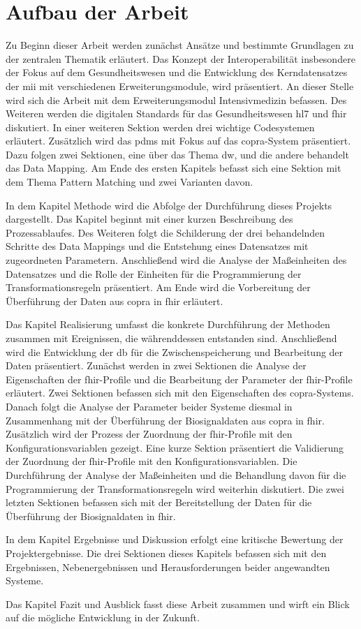\section{Aufbau der Arbeit} \label{sec:structure}

Zu Beginn dieser Arbeit werden zunächst Ansätze und bestimmte Grundlagen zu der zentralen Thematik erläutert. Das Konzept der Interoperabilität insbesondere der Fokus auf dem Gesundheitswesen und die Entwicklung des Kerndatensatzes der \ac{mii} mit verschiedenen Erweiterungsmodule, wird präsentiert. An dieser Stelle wird sich die Arbeit mit dem Erweiterungsmodul Intensivmedizin befassen. Des Weiteren werden die digitalen Standards für das Gesundheitswesen \ac{hl7} und \ac{fhir} diskutiert. In einer weiteren Sektion werden drei wichtige Codesystemen erläutert. Zusätzlich wird das \ac{pdms} mit Fokus auf das \ac{copra}-System präsentiert. Dazu folgen zwei Sektionen, eine über das Thema \ac{dw}, und die andere behandelt das Data Mapping. Am Ende des ersten Kapitels befasst sich eine Sektion mit dem Thema Pattern Matching und zwei Varianten davon.

In dem Kapitel \glqq Methode\grqq{} wird die Abfolge der Durchführung dieses Projekts dargestellt. Das Kapitel beginnt mit einer kurzen Beschreibung des Prozessablaufes. Des Weiteren folgt die Schilderung der drei behandelnden Schritte des Data Mappings und die Entstehung eines Datensatzes mit zugeordneten Parametern. Anschließend wird die Analyse der Maßeinheiten des Datensatzes und die Rolle der Einheiten für die Programmierung der Transformationsregeln präsentiert. Am Ende wird die Vorbereitung der Überführung der Daten aus \ac{copra} in \ac{fhir} erläutert.

Das Kapitel \glqq Realisierung\grqq{} umfasst die konkrete Durchführung der Methoden zusammen mit Ereignissen, die währenddessen entstanden sind. Anschließend wird die Entwicklung der \ac{db} für die Zwischenspeicherung und Bearbeitung der Daten präsentiert. Zunächst werden in zwei Sektionen die Analyse der Eigenschaften der \ac{fhir}-Profile und die Bearbeitung der Parameter der \ac{fhir}-Profile erläutert. Zwei Sektionen befassen sich mit den Eigenschaften des \ac{copra}-Systems. Danach folgt die Analyse der Parameter beider Systeme diesmal in Zusammenhang mit der Überführung der Biosignaldaten aus \ac{copra} in \ac{fhir}. Zusätzlich wird der Prozess der Zuordnung der \ac{fhir}-Profile mit den Konfigurationsvariablen gezeigt. Eine kurze Sektion präsentiert die Validierung der Zuordnung der \ac{fhir}-Profile mit den Konfigurationsvariablen. Die Durchführung der Analyse der Maßeinheiten und die Behandlung davon für die Programmierung der Transformationsregeln wird weiterhin diskutiert. Die zwei letzten Sektionen befassen sich mit der Bereitstellung der Daten für die Überführung der Biosignaldaten in \ac{fhir}.

In dem Kapitel \glqq Ergebnisse und Diskussion\grqq{} erfolgt eine kritische Bewertung der Projektergebnisse. Die drei Sektionen dieses Kapitels befassen sich mit den Ergebnissen, Nebenergebnissen und Herausforderungen beider angewandten Systeme.

Das Kapitel \glqq Fazit und Ausblick\grqq{} fasst diese Arbeit zusammen und wirft ein Blick auf die mögliche Entwicklung in der Zukunft.